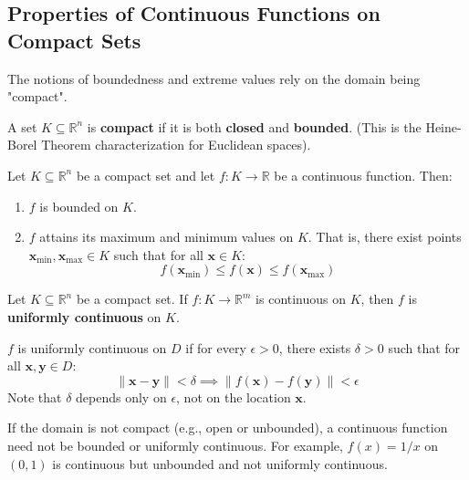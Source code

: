 \subsection{Properties of Continuous Functions on Compact Sets}

The notions of boundedness and extreme values rely on the domain being "compact".

\begin{definition}
A set $K \subseteq \mathbb{R}^n$ is \textbf{compact} if it is both \textbf{closed} and \textbf{bounded}.
(This is the Heine-Borel Theorem characterization for Euclidean spaces).
\end{definition}

\begin{theorem}
Let $K \subseteq \mathbb{R}^n$ be a compact set and let $f: K \to \mathbb{R}$ be a continuous function. Then:
\begin{enumerate}
    \item $f$ is bounded on $K$.
    \item $f$ attains its maximum and minimum values on $K$. That is, there exist points $\mathbf{x}_{\min}, \mathbf{x}_{\max} \in K$ such that for all $\mathbf{x} \in K$:
    \[ f(\mathbf{x}_{\min}) \le f(\mathbf{x}) \le f(\mathbf{x}_{\max}) \]
\end{enumerate}
\end{theorem}

\begin{theorem}
Let $K \subseteq \mathbb{R}^n$ be a compact set. If $f: K \to \mathbb{R}^m$ is continuous on $K$, then $f$ is \textbf{uniformly continuous} on $K$.
\end{theorem}

\begin{definition}
$f$ is uniformly continuous on $D$ if for every $\epsilon > 0$, there exists $\delta > 0$ such that for all $\mathbf{x}, \mathbf{y} \in D$:
\[ \|\mathbf{x} - \mathbf{y}\| < \delta \implies \|f(\mathbf{x}) - f(\mathbf{y})\| < \epsilon \]
Note that $\delta$ depends only on $\epsilon$, not on the location $\mathbf{x}$.
\end{definition}

\begin{remark}
If the domain is not compact (e.g., open or unbounded), a continuous function need not be bounded or uniformly continuous.
For example, $f(x) = 1/x$ on $(0, 1)$ is continuous but unbounded and not uniformly continuous.
\end{remark}

